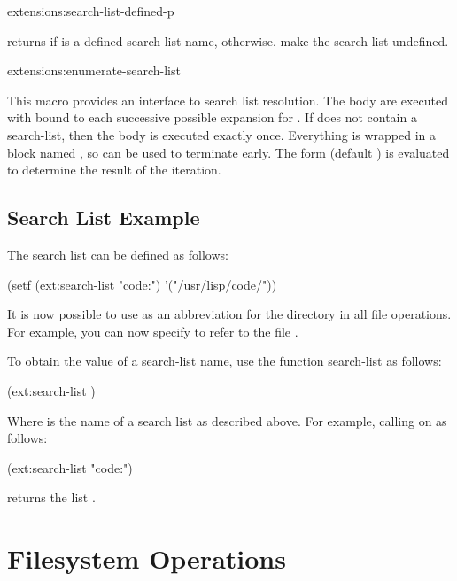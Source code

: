 \begin{defun}{extensions:}{search-list-defined-p}{}
  
   returns \true{} if  is a
  defined search list name, \false{} otherwise.
   make the search list  undefined.
\end{defun}

\begin{defmac}{extensions:}{enumerate-search-list}{%
    }
  
  This macro provides an interface to search list resolution.  The
  body  are executed with  bound to each
  successive possible expansion for .  If  does
  not contain a search-list, then the body is executed exactly once.
  Everything is wrapped in a block named \nil, so  can be
  used to terminate early.  The  form (default \nil) is
  evaluated to determine the result of the iteration.
\end{defmac}


\subsection{Search List Example}

The search list  can be defined as follows:
\begin{example}
(setf (ext:search-list "code:") '("/usr/lisp/code/"))
\end{example}
It is now possible to use  as an abbreviation for the directory
 in all file operations.  For example, you can now specify
 to refer to the file .

To obtain the value of a search-list name, use the function search-list
as follows:
\begin{example}
(ext:search-list )
\end{example}
Where  is the name of a search list as described above.  For example,
calling  on  as follows:
\begin{example}
(ext:search-list "code:")
\end{example}
returns the list .


\section{Filesystem Operations}


